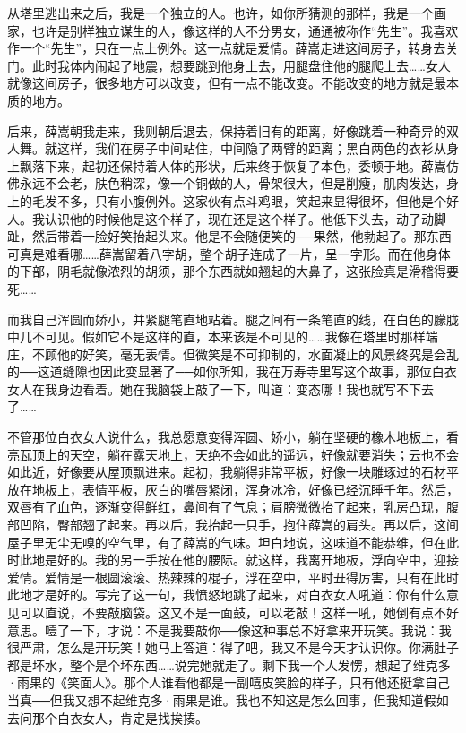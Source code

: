 从塔里逃出来之后，我是一个独立的人。也许，如你所猜测的那样，我是一个画家，也许是别样独立谋生的人，像这样的人不分男女，通通被称作“先生”。我喜欢作一个“先生”，只在一点上例外。这一点就是爱情。薛嵩走进这间房子，转身去关门。此时我体内闹起了地震，想要跳到他身上去，用腿盘住他的腿爬上去……女人就像这间房子，很多地方可以改变，但有一点不能改变。不能改变的地方就是最本质的地方。 

后来，薛嵩朝我走来，我则朝后退去，保持着旧有的距离，好像跳着一种奇异的双人舞。就这样，我们在房子中间站住，中间隐了两臂的距离；黑白两色的衣衫从身上飘落下来，起初还保持着人体的形状，后来终于恢复了本色，委顿于地。薛嵩仿佛永远不会老，肤色稍深，像一个铜做的人，骨架很大，但是削瘦，肌肉发达，身上的毛发不多，只有小腹例外。这家伙有点斗鸡眼，笑起来显得很坏，但他是个好人。我认识他的时候他是这个样子，现在还是这个样子。他低下头去，动了动脚趾，然后带着一脸好笑抬起头来。他是不会随便笑的──果然，他勃起了。那东西可真是难看哪……薛嵩留着八字胡，整个胡子连成了一片，呈一字形。而在他身体的下部，阴毛就像浓烈的胡须，那个东西就如翘起的大鼻子，这张脸真是滑稽得要死…… 

而我自己浑圆而娇小，并紧腿笔直地站着。腿之间有一条笔直的线，在白色的朦胧中几不可见。假如它不是这样的直，本来该是不可见的……我像在塔里时那样端庄，不顾他的好笑，毫无表情。但微笑是不可抑制的，水面凝止的风景终究是会乱的──这道缝隙也因此变显著了──如你所知，我在万寿寺里写这个故事，那位白衣女人在我身边看着。她在我脑袋上敲了一下，叫道：变态哪！我也就写不下去了…… 

不管那位白衣女人说什么，我总愿意变得浑圆、娇小，躺在坚硬的橡木地板上，看亮瓦顶上的天空，躺在露天地上，天绝不会如此的遥远，好像就要消失；云也不会如此近，好像要从屋顶飘进来。起初，我躺得非常平板，好像一块雕琢过的石材平放在地板上，表情平板，灰白的嘴唇紧闭，浑身冰冷，好像已经沉睡千年。然后，双唇有了血色，逐渐变得鲜红，鼻间有了气息；肩膀微微抬了起来，乳房凸现，腹部凹陷，臀部翘了起来。再以后，我抬起一只手，抱住薛嵩的肩头。再以后，这间屋子里无尘无嗅的空气里，有了薛嵩的气味。坦白地说，这味道不能恭维，但在此时此地是好的。我的另一手按在他的腰际。就这样，我离开地板，浮向空中，迎接爱情。爱情是一根圆滚滚、热辣辣的棍子，浮在空中，平时丑得厉害，只有在此时此地才是好的。写完了这一句，我愤怒地跳了起来，对白衣女人吼道：你有什么意见可以直说，不要敲脑袋。这又不是一面鼓，可以老敲！这样一吼，她倒有点不好意思。噎了一下，才说：不是我要敲你──像这种事总不好拿来开玩笑。我说：我很严肃，怎么是开玩笑！她马上答道：得了吧，我又不是今天才认识你。你满肚子都是坏水，整个是个坏东西……说完她就走了。剩下我一个人发愣，想起了维克多·雨果的《笑面人》。那个人谁看他都是一副嘻皮笑脸的样子，只有他还挺拿自己当真──但我又想不起维克多·雨果是谁。我也不知这是怎么回事，但我知道假如去问那个白衣女人，肯定是找挨揍。 

